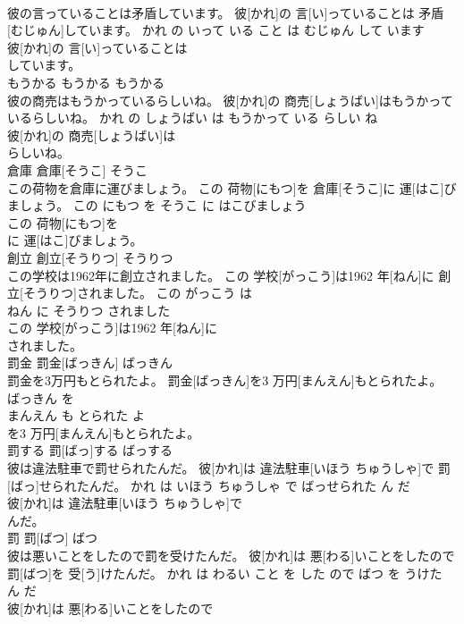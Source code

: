 \documentclass[8pt]{extreport}
\begin{document}
\begin{CJK}{UTF8}{min}
\\	彼の言っていることは矛盾しています。	彼[かれ]の 言[い]っていることは 矛盾[むじゅん]しています。	かれ の いって いる こと は むじゅん して います	
\\	彼[かれ]の 言[い]っていることは
\\	しています。			
\\	もうかる	もうかる	もうかる	
\\	彼の商売はもうかっているらしいね。	彼[かれ]の 商売[しょうばい]はもうかっているらしいね。	かれ の しょうばい は もうかって いる らしい ね	
\\	彼[かれ]の 商売[しょうばい]は
\\	らしいね。			
\\	倉庫	倉庫[そうこ]	そうこ	
\\	この荷物を倉庫に運びましょう。	この 荷物[にもつ]を 倉庫[そうこ]に 運[はこ]びましょう。	この にもつ を そうこ に はこびましょう	
\\	この 荷物[にもつ]を
\\	に 運[はこ]びましょう。			
\\	創立	創立[そうりつ]	そうりつ	
\\	この学校は1962年に創立されました。	この 学校[がっこう]は1962 年[ねん]に 創立[そうりつ]されました。	この がっこう は 
\\	ねん に そうりつ されました	
\\	この 学校[がっこう]は1962 年[ねん]に
\\	されました。			
\\	罰金	罰金[ばっきん]	ばっきん	
\\	罰金を3万円もとられたよ。	罰金[ばっきん]を3 万円[まんえん]もとられたよ。	ばっきん を 
\\	まんえん も とられた よ	
\\	を3 万円[まんえん]もとられたよ。			
\\	罰する	罰[ばっ]する	ばっする	
\\	彼は違法駐車で罰せられたんだ。	彼[かれ]は 違法駐車[いほう ちゅうしゃ]で 罰[ばっ]せられたんだ。	かれ は いほう ちゅうしゃ で ばっせられた ん だ	
\\	彼[かれ]は 違法駐車[いほう ちゅうしゃ]で
\\	んだ。			
\\	罰	罰[ばつ]	ばつ	
\\	彼は悪いことをしたので罰を受けたんだ。	彼[かれ]は 悪[わる]いことをしたので 罰[ばつ]を 受[う]けたんだ。	かれ は わるい こと を した ので ばつ を うけた ん だ	
\\	彼[かれ]は 悪[わる]いことをしたので

\end{CJK}
\end{document}
